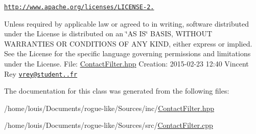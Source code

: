 \href{http://www.apache.org/licenses/LICENSE-2.0}{\tt http\-://www.\-apache.\-org/licenses/\-L\-I\-C\-E\-N\-S\-E-\/2.}

Unless required by applicable law or agreed to in writing, software distributed under the License is distributed on an \char`\"{}\-A\-S I\-S\char`\"{} B\-A\-S\-I\-S, W\-I\-T\-H\-O\-U\-T W\-A\-R\-R\-A\-N\-T\-I\-E\-S O\-R C\-O\-N\-D\-I\-T\-I\-O\-N\-S O\-F A\-N\-Y K\-I\-N\-D, either express or implied. See the License for the specific language governing permissions and limitations under the License. File\-: \hyperlink{_contact_filter_8hpp}{Contact\-Filter.\-hpp} Creation\-: 2015-\/02-\/23 12\-:40 Vincent Rey \href{mailto:vrey@student.42.fr}{\tt vrey@student..\-fr} 

The documentation for this class was generated from the following files\-:\begin{DoxyCompactItemize}
\item 
/home/louis/\-Documents/rogue-\/like/\-Sources/inc/\hyperlink{_contact_filter_8hpp}{Contact\-Filter.\-hpp}\item 
/home/louis/\-Documents/rogue-\/like/\-Sources/src/\hyperlink{_contact_filter_8cpp}{Contact\-Filter.\-cpp}\end{DoxyCompactItemize}
